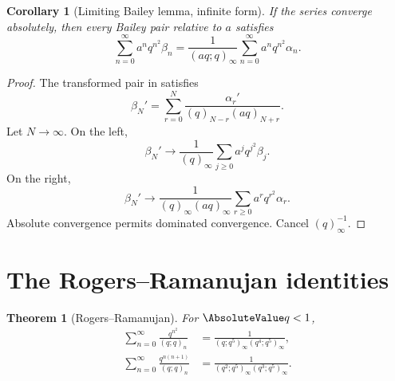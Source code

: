 \documentclass[11pt,a4paper,oneside,openany]{book}
\newtheorem{theorem}{Theorem}[chapter]
\newtheorem{corollary}[corollary]{Corollary}
\theoremstyle{definition}
\theoremstyle{remark}
\begin{document}
\begin{corollary}[Limiting Bailey lemma, infinite form]\label{cor:bailey-limit-infinite}
If the series converge absolutely, then every Bailey pair relative to $a$ satisfies
\[
 \sum_{n=0}^{\infty}a^nq^{n^2}\beta_n
 =\frac1{(aq;q)_\infty}
 \sum_{n=0}^{\infty}a^nq^{n^2}\alpha_n.
\]
\end{corollary}

\begin{proof}
The transformed pair in  satisfies
\[
 \beta_N'=\sum_{r=0}^{N}
 \frac{\alpha_r'}{(q)_{N-r}(aq)_{N+r}}.
\]
Let $N\to\infty$.  On the left,
\[
 \beta_N'\longrightarrow\frac1{(q)_\infty}
 \sum_{j\ge0}a^jq^{j^2}\beta_j.
\]
On the right,
\[
 \beta_N'\longrightarrow
 \frac1{(q)_\infty(aq)_\infty}
 \sum_{r\ge0}a^rq^{r^2}\alpha_r.
\]
Absolute convergence permits dominated convergence.  Cancel $(q)_\infty^{-1}$.
\end{proof}

\section{The Rogers--Ramanujan identities}

\begin{theorem}[Rogers--Ramanujan]\label{thm:rogers-ramanujan}
For $\AbsoluteValue q<1$,
\begin{align}
 \sum_{n=0}^{\infty}\frac{q^{n^2}}{(q;q)_n}
 &=\frac1{(q;q^5)_\infty(q^4;q^5)_\infty},\label{eq:RR1}\\
 \sum_{n=0}^{\infty}\frac{q^{n(n+1)}}{(q;q)_n}
 &=\frac1{(q^2;q^5)_\infty(q^3;q^5)_\infty}.
 \label{eq:RR2}
\end{align}
\end{theorem}
\end{document}
